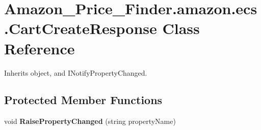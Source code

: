 \hypertarget{class_amazon___price___finder_1_1amazon_1_1ecs_1_1_cart_create_response}{\section{Amazon\-\_\-\-Price\-\_\-\-Finder.\-amazon.\-ecs.\-Cart\-Create\-Response Class Reference}
\label{class_amazon___price___finder_1_1amazon_1_1ecs_1_1_cart_create_response}
}


 




Inherits object, and I\-Notify\-Property\-Changed.

\subsection*{Protected Member Functions}
\begin{DoxyCompactItemize}
\item 
\hypertarget{class_amazon___price___finder_1_1amazon_1_1ecs_1_1_cart_create_response_a00ae10aebc4746e9d4d39b4921d8b028}{void {\bfseries Raise\-Property\-Changed} (string property\-Name)}\label{class_amazon___price___finder_1_1amazon_1_1ecs_1_1_cart_create_response_a00ae10aebc4746e9d4d39b4921d8b028}

\end{DoxyCompactItemize}
